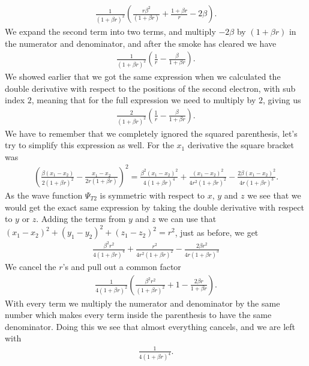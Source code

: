 \documentclass[%
 reprint,
nofootinbib,
aps,
]{revtex4-1}
\begin{document}
\begin{gather}
  \frac{1}{(1+\beta r)^2}\left( \frac{r\beta^2}{(1+\beta r)} + \frac{1+\beta r}{r} - 2\beta  \right).
\end{gather}
We expand the second term into two terms, and multiply $-2\beta$ by $(1+\beta r)$ in the numerator and denominator, and after the smoke has cleared we have
\begin{gather}
  \frac{1}{(1+\beta r)^2}\left(\frac{1}{r} - \frac{\beta}{1+\beta r} \right).
\end{gather}
We showed earlier that we got the same expression when we calculated the double derivative with respect to the positions of the second electron, with sub index $2$, meaning that for the full expression we need to multiply by $2$, giving us
\begin{gather}
  \frac{2}{(1+\beta r)^2}\left(\frac{1}{r} - \frac{\beta}{1+\beta r} \right). \label{first}
\end{gather}
We have to remember that we completely ignored the squared parenthesis, let's try to simplify this expression as well. For the $x_1$ derivative the square bracket was
\begin{gather}
  \left( \frac{\beta(x_1-x_2)}{2(1+\beta r)^2} - \frac{x_1-x_2}{2r(1+\beta r)} \right)^2 = \frac{\beta^2(x_1-x_2)^2}{4(1+\beta r)^4} + \frac{(x_1-x_2)^2}{4r^2(1+\beta r)^2} - \frac{2\beta(x_1-x_2)^2}{4r(1+\beta r)^3}.
\end{gather}
As the wave function $\Psi_{T2}$ is symmetric with respect to $x$, $y$ and $z$ we see that we would get the exact same expression by taking the double derivative with respect to $y$ or $z$. Adding the terms from $y$ and $z$ we can use that $(x_1-x_2)^2+(y_1-y_2)^2+(z_1-z_2)^2=r^2$, just as before, we get
\begin{gather}
  \frac{\beta^2r^2}{4(1+\beta r)^4} + \frac{r^2}{4r^2(1+\beta r)^2} - \frac{2\beta r^2}{4r(1+\beta r)^3}
\end{gather}
We cancel the $r$'s and pull out a common factor
\begin{gather}
  \frac{1}{4(1+\beta r)^2}\left( \frac{\beta^2r^2}{(1+\beta r)^2} + 1 - \frac{2\beta r}{1+\beta r} \right).
\end{gather}
With every term we multiply the numerator and denominator by the same number which makes every term inside the parenthesis to have the same denominator. Doing this we see that almost everything cancels, and we are left with
\begin{gather}
  \frac{1}{4(1+\beta r)^4} \label{second}.
\end{gather}
\end{document}
